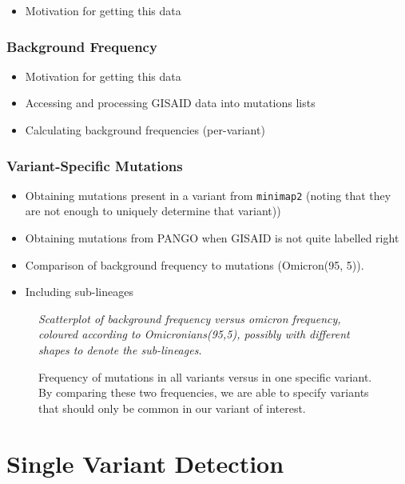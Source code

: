 \documentclass{article}
\newenvironment{tightemize}
{ \begin{itemize}
    \setlength{\itemsep}{0pt}
    \setlength{\parskip}{0pt}
    \setlength{\parsep}{0pt}     }
{ \end{itemize}                  }
\begin{document}
\begin{tightemize}
    \item Motivation for getting this data
\end{tightemize}

\subsubsection{Background Frequency}
\begin{tightemize}
    \item Motivation for getting this data
    \item Accessing and processing GISAID data into mutations lists
    \item Calculating background frequencies (per-variant)
\end{tightemize}

\subsubsection{Variant-Specific Mutations}

\begin{tightemize}
    \item Obtaining mutations present in a variant from \texttt{minimap2} (noting that they are not enough to uniquely determine that variant))
    \item Obtaining mutations from PANGO when GISAID is not quite labelled right
    \item Comparison of background frequency to mutations (Omicron(95, 5)). 
    \item Including sub-lineages
\end{tightemize}

\begin{figure}[ht!]
\vspace{2cm}
\centering
\emph{Scatterplot of background frequency versus omicron frequency, coloured according to Omicronians(95,5), possibly with different shapes to denote the sub-lineages.}
\vspace{2cm}
\caption{Frequency of mutations in all variants versus in one specific variant. By comparing these two frequencies, we are able to specify variants that should only be common in our variant of interest.}
\label{fig:mutation_frequency}
\end{figure}






\section{Single Variant Detection}
\end{document}
